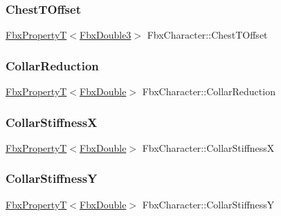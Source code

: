 \mbox{\label{class_fbx_character_add78528e2f4e980a41a4b6e2a03ff32d}} 
\subsubsection{\texorpdfstring{Chest\+T\+Offset}{ChestTOffset}}
{\footnotesize\ttfamily \hyperlink{class_fbx_property_t}{Fbx\+PropertyT}$<$\hyperlink{fbxtypes_8h_ae0a96f14cde566774c7553aa7523b7a7}{Fbx\+Double3}$>$ Fbx\+Character\+::\+Chest\+T\+Offset}

\mbox{\label{class_fbx_character_ac3906f09d97af9fea25de19b1faab968}} 
\subsubsection{\texorpdfstring{Collar\+Reduction}{CollarReduction}}
{\footnotesize\ttfamily \hyperlink{class_fbx_property_t}{Fbx\+PropertyT}$<$\hyperlink{fbxtypes_8h_a171e72a1c46fc15c1a6c9c31948c1c5b}{Fbx\+Double}$>$ Fbx\+Character\+::\+Collar\+Reduction}

\mbox{\label{class_fbx_character_a02276549abd3825a728faf703dc76cc7}} 
\subsubsection{\texorpdfstring{Collar\+StiffnessX}{CollarStiffnessX}}
{\footnotesize\ttfamily \hyperlink{class_fbx_property_t}{Fbx\+PropertyT}$<$\hyperlink{fbxtypes_8h_a171e72a1c46fc15c1a6c9c31948c1c5b}{Fbx\+Double}$>$ Fbx\+Character\+::\+Collar\+StiffnessX}

\mbox{\label{class_fbx_character_a13377b6a419571905e106f44f31c7c8e}} 
\subsubsection{\texorpdfstring{Collar\+StiffnessY}{CollarStiffnessY}}
{\footnotesize\ttfamily \hyperlink{class_fbx_property_t}{Fbx\+PropertyT}$<$\hyperlink{fbxtypes_8h_a171e72a1c46fc15c1a6c9c31948c1c5b}{Fbx\+Double}$>$ Fbx\+Character\+::\+Collar\+StiffnessY}

